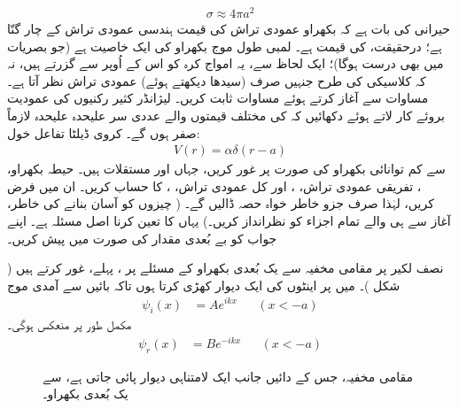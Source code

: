 \begin{align}
	\sigma\approx4\pi a^2
\end{align}
حیرانی کی بات ہے کہ بکھراو عمودی تراش کی قیمت ہندسی عمودی تراش کے چار گنّا ہے؛  درحقیقت،   کی قیمت   ہے۔ لمبی طول موج بکھراو کی ایک خاصیت    ہے (جو بصریات میں بھی  درست ہوگا)؛  ایک لحاظ سے،  یہ امواج کرہ کو    اس کے اُوپر سے گزرتے ہیں،  نہ کہ کلاسیکی   کی طرح جنہیں صرف (سیدھا دیکھتے ہوئے)  عمودی تراش نظر آتا ہے۔
مساوات   سے آغاز کرتے ہوئے مساوات   ثابت کریں۔    لیژانڈر کثیر رکنیوں  کی عمودیت بروئے کار لاتے ہوئے دکھائیں کہ  کی مختلف قیمتوں والے عددی سر علیحدہ علیحدہ  لازماً صفر ہوں گے۔
کروی ڈیلٹا تفاعل خول:
\begin{align*}
	V(r) = \alpha\delta(r-a)
\end{align*}
سے کم توانائی بکھراو کی صورت  پر غور کریں،  جہاں  اور  مستقلات ہیں۔ حیطہ بکھراو،  ،  تفریقی عمودی تراش،  ،  اور کل عمودی تراش،  ،  کا حساب کریں۔ ان میں  فرض کریں،  لہٰذا صرف  جزو  خاطر خواہ حصہ ڈالیں گے۔  ( چیزوں کو آسان بنانے کی خاطر،  آغاز سے ہی  والے تمام اجزاء کو نظرانداز کریں۔) یہاں  کا  تعین کرنا اصل مسئلہ ہے۔ اپنے جواب کو بے بُعدی مقدار  کی صورت میں پیش کریں۔

 	


 نصف لکیر  پر مقامی مخفیہ  سے یک بُعدی بکھراو کے مسئلے پر ، پہلے،  غور  کرتے ہیں ( شکل )۔     میں  پر اینٹوں  کی ایک دیوار کھڑی کرتا ہوں تاکہ بائیں سے آمدی موج 
\begin{align}
	\psi_i(x) &= Ae^{ikx}&&(x<-a)
\end{align}
مکمل طور پر منعکس ہوگی۔
\begin{align}
	\psi_r(x) &= Be^{-ikx}&&(x<-a)
\end{align}
%
\begin{figure}
\centering
{}
\caption{مقامی مخفیہ، جس کے  دائیں جانب ایک   لامتناہی دیوار  پائی جاتی ہے، سے یک بُعدی بکھراو۔}
\label{شکل_بکھراو_یک_بعدی_مقامی_مخفیہ}
\end{figure}

